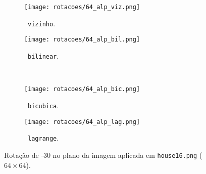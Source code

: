 \begin{figure}[H]
    \centering
    \begin{subfigure}{0.3\textwidth}
        \centering
        \texttt{[image: rotacoes/64\_alp\_viz.png]}
        \caption{~\texttt{vizinho}.}
    \end{subfigure}%
    \hspace{8pt}%
    \begin{subfigure}{0.3\textwidth}
        \centering
        \texttt{[image: rotacoes/64\_alp\_bil.png]}
        \caption{~\texttt{bilinear}.}
    \end{subfigure}
    \\[8pt]
    \begin{subfigure}{0.3\textwidth}
        \centering
        \texttt{[image: rotacoes/64\_alp\_bic.png]}
        \caption{~\texttt{bicubica}.}
    \end{subfigure}%
    \hspace{8pt}%
    \begin{subfigure}{0.3\textwidth}
        \centering
        \texttt{[image: rotacoes/64\_alp\_lag.png]}
        \caption{~\texttt{lagrange}.}
    \end{subfigure}

    \caption{Rotação de -30\textdegree{} no plano da imagem aplicada em \texttt{house16.png} ($64 \times 64$).}
    \label{fig:rot:house64}
\end{figure}